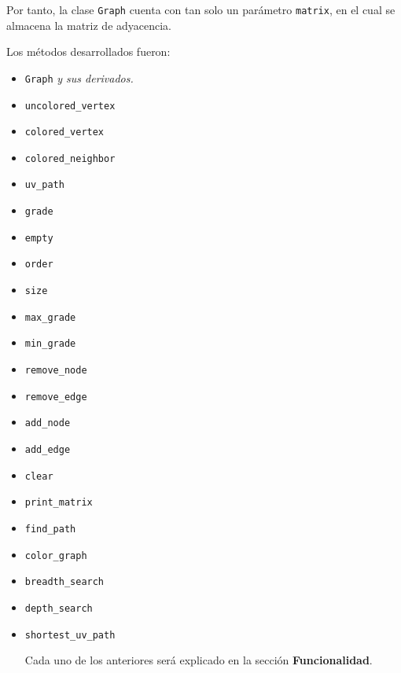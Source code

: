 \documentclass[conference]{IEEEtran}
\begin{document}
Por tanto, la clase \texttt{Graph} cuenta con tan solo un parámetro \texttt{matrix}, en el cual se almacena la matriz de adyacencia.

Los métodos desarrollados fueron: 
\begin{itemize}
	\item \texttt{Graph} \textit{y sus derivados.}
	
	\item \texttt{uncolored\_vertex}
	
	\item \texttt{colored\_vertex}
	
	\item \texttt{colored\_neighbor}
	
	\item \texttt{uv\_path}
	
	\item \texttt{grade}
	
	\item \texttt{empty}
	
	\item \texttt{order}
	
	\item \texttt{size}
	
	\item \texttt{max\_grade}
	
	\item \texttt{min\_grade}
	
	\item \texttt{remove\_node}
	
	\item \texttt{remove\_edge}
	
	\item \texttt{add\_node}
	
	\item  \texttt{add\_edge}
	
	\item \texttt{clear}
	
	\item \texttt{print\_matrix}
	
	\item \texttt{find\_path}
	
	\item \texttt{color\_graph}
	
	\item \texttt{breadth\_search}
	
	\item \texttt{depth\_search}
	
	\item \texttt{shortest\_uv\_path}
	
	Cada uno de los anteriores será explicado en la sección \textbf{Funcionalidad}.
\end{itemize} 
\end{document}
